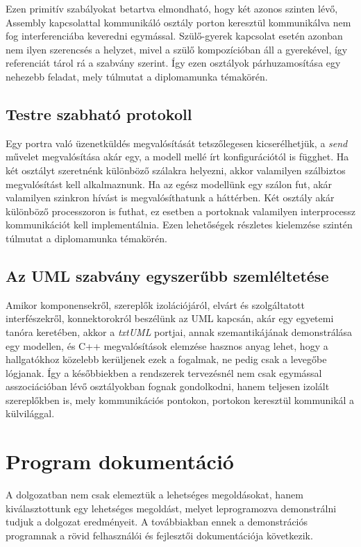 \documentclass[a4paper,12pt]{report}
\begin{document}
Ezen primitív szabályokat betartva elmondható, hogy két azonos szinten lévő, Assembly kapcsolattal kommunikáló osztály porton keresztül kommunikálva nem fog interferenciába keveredni egymással. Szülő-gyerek kapcsolat esetén azonban nem ilyen szerencsés a helyzet, mivel a szülő kompozícióban áll a gyerekével, így referenciát tárol rá a szabvány szerint. Így ezen osztályok párhuzamosítása egy nehezebb feladat, mely túlmutat a diplomamunka témakörén.

\section{Testre szabható protokoll}
Egy portra való üzenetküldés megvalósítását tetszőlegesen kicserélhetjük, a \textit{send} művelet megvalósítása akár egy, a modell mellé írt konfigurációtól is függhet. Ha két osztályt szeretnénk különböző szálakra helyezni, akkor valamilyen szálbiztos megvalósítást kell alkalmaznunk. Ha az egész modellünk egy szálon fut, akár valamilyen szinkron hívást is megvalósíthatunk a háttérben. Két osztály akár különböző processzoron is futhat, ez esetben a portoknak valamilyen interprocessz kommunikációt kell implementálnia. Ezen lehetőségek részletes kielemzése szintén túlmutat a diplomamunka témakörén. 

\section{Az UML szabvány egyszerűbb szemléltetése}
Amikor komponensekről, szereplők izolációjáról, elvárt és szolgáltatott interfészekről, konnektorokról beszélünk az UML kapcsán, akár egy egyetemi tanóra keretében, akkor a \textit{txtUML} portjai, annak szemantikájának demonstrálása egy modellen, és C++ megvalósítások elemzése hasznos anyag lehet, hogy a hallgatókhoz közelebb kerüljenek ezek a fogalmak, ne pedig csak a levegőbe lógjanak. Így a későbbiekben a rendszerek tervezésnél nem csak egymással asszociációban lévő osztályokban fognak gondolkodni, hanem teljesen izolált szereplőkben is, mely kommunikációs pontokon, portokon keresztül kommunikál a külvilággal. 


\chapter{Program dokumentáció}
A dolgozatban nem csak elemeztük a lehetséges megoldásokat, hanem kiválasztottunk egy lehetséges megoldást, melyet leprogramozva demonstrálni tudjuk a dolgozat eredményeit. A továbbiakban ennek a demonstrációs programnak a rövid felhasználói és fejlesztői dokumentációja következik.
\end{document}
